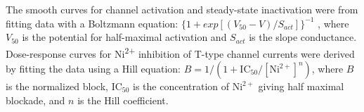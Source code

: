 The smooth curves for channel activation and steady-state inactivation were from fitting data with a Boltzmann equation: $\{1+exp[(V_{50}-V)/S_{act}]\}^{-1}$ , where $V_{50}$ is the potential for half-maximal activation and $S_{act}$ is the slope conductance.
Dose-response curves for Ni\textsuperscript{2+} inhibition of T-type channel currents were derived by fitting the data using a Hill equation: $B = 1/(1 + \textrm{IC}_{50}/[\textrm{Ni}^{2+}]^n)$, where $B$ is the normalized block, $\textrm{IC}_{50}$ is the concentration of $\textrm{Ni}^{2+}$ giving half maximal blockade, and $n$ is the Hill coefficient.

  
  
  
  
  
  
  
  
  
  
  
  
  
  
  
  